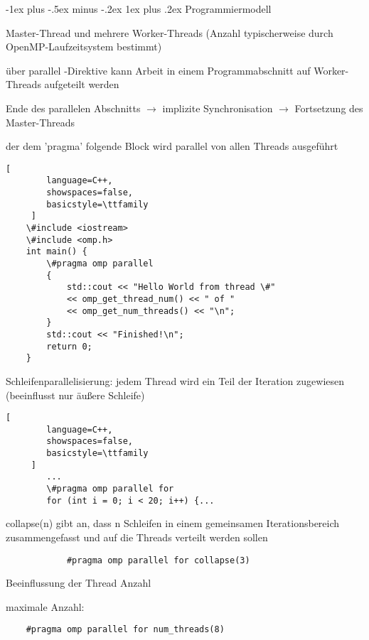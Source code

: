 \documentclass[10pt]{article}
\makeatletter
\renewcommand{\subsubsection}{\@startsection{subsubsection}{3}{0mm}%
                                {-1ex plus -.5ex minus -.2ex}%
                                {1ex plus .2ex}%
                                {\normalfont\small\bfseries}}
\makeatother
\begin{document}
\begin{itemize*}
\subsubsection{Programmiermodell}
\begin{itemize*}
  \item Master-Thread und mehrere Worker-Threads (Anzahl typischerweise durch OpenMP-Laufzeitsystem bestimmt)
  \item über parallel -Direktive kann Arbeit in einem Programmabschnitt auf Worker-Threads aufgeteilt werden
  \item Ende des parallelen Abschnitts $\rightarrow$ implizite Synchronisation $\rightarrow$ Fortsetzung des Master-Threads
  \item der dem 'pragma' folgende Block wird parallel von allen Threads ausgeführt
  \begin{lstlisting}[
        language=C++,
        showspaces=false,
        basicstyle=\ttfamily
     ]
    \#include <iostream>
    \#include <omp.h>
    int main() {
        \#pragma omp parallel
        {
            std::cout << "Hello World from thread \#"
            << omp_get_thread_num() << " of "
            << omp_get_num_threads() << "\n";
        }
        std::cout << "Finished!\n";
        return 0;
    }
    \end{lstlisting}
  \item Schleifenparallelisierung: jedem Thread wird ein Teil der Iteration zugewiesen (beeinflusst nur äußere Schleife)
  \begin{lstlisting}[
        language=C++,
        showspaces=false,
        basicstyle=\ttfamily
     ]
        ...
        \#pragma omp parallel for
        for (int i = 0; i < 20; i++) {...
    \end{lstlisting}
  \begin{itemize*}
    \item collapse(n) gibt an, dass n Schleifen in einem gemeinsamen Iterationsbereich zusammengefasst und auf die Threads verteilt werden sollen
    \begin{lstlisting}
            #pragma omp parallel for collapse(3)
        \end{lstlisting}
  \end{itemize*}
  \item Beeinflussung der Thread Anzahl
  \begin{itemize*}
    \item maximale Anzahl:
    \begin{lstlisting}
    #pragma omp parallel for num_threads(8)

\end{lstlisting}
\end{itemize*}
\end{itemize*}
\end{itemize*}
\end{document}
